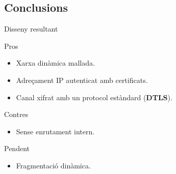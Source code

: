 \subsection{Conclusions}
    \begin{frame}{Disseny resultant}
    	\begin{exampleblock}{Pros}
        \begin{itemize}
\item Xarxa dinàmica mallada.
\item Adreçament IP autenticat amb certificats.
\item Canal xifrat amb un protocol estàndard (\textbf{DTLS}).
        \end{itemize}
    	\end{exampleblock}
	    \begin{alertblock}{Contres}
        \begin{itemize}
\item Sense enrutament intern.
        \end{itemize}
	    \end{alertblock}
        \begin{block}{Pendent}
        \begin{itemize}
\item Fragmentació dinàmica.
        \end{itemize}
        \end{block}
    \end{frame}

